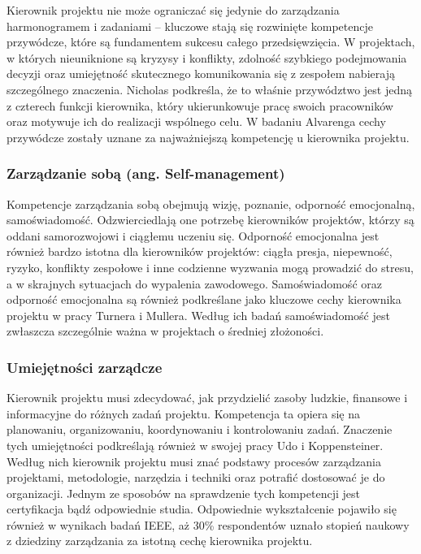 Kierownik projektu nie może ograniczać się jedynie do zarządzania harmonogramem i zadaniami – kluczowe stają się rozwinięte kompetencje przywódcze, które są fundamentem sukcesu całego przedsięwzięcia. W projektach, w których nieuniknione są kryzysy i konflikty, zdolność szybkiego podejmowania decyzji oraz umiejętność skutecznego komunikowania się z zespołem nabierają szczególnego znaczenia. Nicholas podkreśla, że to właśnie przywództwo jest jedną z czterech funkcji kierownika, który ukierunkowuje pracę swoich pracowników oraz motywuje ich do realizacji wspólnego celu. \autocite{NicholasSteyn} 
W badaniu Alvarenga cechy przywódcze zostały uznane za najważniejszą kompetencję u kierownika projektu.\autocite{Alvarenga}

\subsubsection{Zarządzanie sobą (ang. Self-management)}
Kompetencje zarządzania sobą obejmują wizję, poznanie, odporność emocjonalną, samoświadomość. Odzwierciedlają one potrzebę kierowników projektów, którzy są oddani samorozwojowi i ciągłemu uczeniu się. Odporność emocjonalna jest również bardzo istotna dla kierowników projektów: ciągła presja, niepewność, ryzyko, konflikty zespołowe i inne codzienne wyzwania mogą prowadzić do stresu, a w skrajnych sytuacjach do wypalenia zawodowego.\autocite{Alvarenga} Samoświadomość oraz odporność emocjonalna są również podkreślane jako kluczowe cechy kierownika projektu w pracy Turnera i Mullera. Według ich badań samoświadomość jest zwłaszcza szczególnie ważna w projektach o średniej złożoności.\autocite{turnermuller2010}

\subsubsection{Umiejętności zarządcze}
Kierownik projektu musi zdecydować, jak przydzielić zasoby ludzkie, finansowe i informacyjne do różnych zadań projektu. Kompetencja ta opiera się na planowaniu, organizowaniu, koordynowaniu i kontrolowaniu zadań.\autocite{Gottschalk} Znaczenie tych umiejętności podkreślają również w swojej pracy Udo i Koppensteiner. Według nich kierownik projektu musi znać podstawy procesów zarządzania projektami, metodologie, narzędzia i techniki oraz potrafić dostosować je do organizacji.
Jednym ze sposobów na sprawdzenie tych kompetencji jest certyfikacja bądź odpowiednie studia.\autocite{Koppensteiner} Odpowiednie wykształcenie pojawiło się również w wynikach badań IEEE, aż 30\% respondentów uznało stopień naukowy z dziedziny zarządzania za istotną cechę kierownika projektu.\autocite{analizaMulti}

